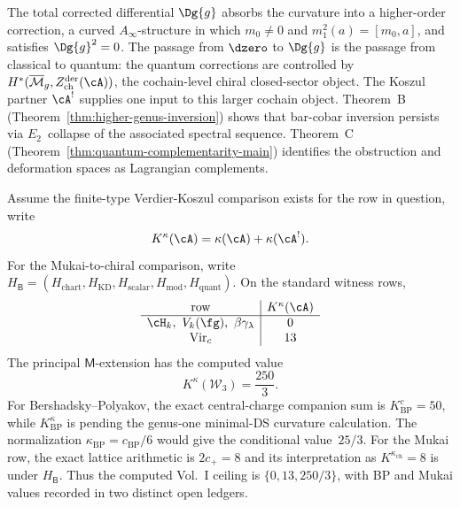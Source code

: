 The total corrected differential $\Dg{g}$ absorbs the curvature into a higher-order correction, a curved $A_\infty$-structure in which $m_0 \neq 0$ and $m_1^2(a) = [m_0, a]$, and satisfies $\Dg{g}^2 = 0$. The passage from $\dzero$ to $\Dg{g}$ is the passage from classical to quantum: the quantum corrections are controlled by
$H^*(\overline{\mathcal{M}}_g,
Z^{\mathrm{der}}_{\mathrm{ch}}(\cA))$, the cochain-level chiral
closed-sector object.  The Koszul partner $\cA^!$ supplies one input to
this larger cochain object.  Theorem~B
(Theorem~\ref{thm:higher-genus-inversion}) shows that bar-cobar
inversion persists via $E_2$~collapse of the associated spectral
sequence. Theorem~C (Theorem~\ref{thm:quantum-complementarity-main})
identifies the obstruction and deformation spaces as Lagrangian
complements.

\begin{proposition}
\label{prop:kps-scalar-verdier-sums}
Assume the finite-type Verdier-Koszul comparison exists for the row in
question, write
\[
 K^\kappa(\cA)=\kappa(\cA)+\kappa(\cA^!).
\]
For the Mukai-to-chiral comparison, write
$H_{\mathsf B}=(H_{\mathrm{chart}},H_{\mathrm{KD}},H_{\mathrm{scalar}},
H_{\mathrm{mod}},H_{\mathrm{quant}})$.
On the standard witness rows,
\[
\begin{array}{c|c}
\textup{row} & K^\kappa(\cA)\\
\hline
\cH_k,\ V_k(\fg),\ \beta\gamma_\lambda & 0\\
\mathrm{Vir}_c & 13
\end{array}
\]
The principal $\mathsf M$-extension has the computed value
\[
K^\kappa(\mathcal W_3)=\frac{250}{3}.
\]
For Bershadsky--Polyakov, the exact central-charge companion sum is
$K^c_{\mathrm{BP}}=50$, while $K^\kappa_{\mathrm{BP}}$ is
\ClaimStatusOpen{} pending the genus-one minimal-DS curvature
calculation.  The normalization $\kappa_{\mathrm{BP}}=c_{\mathrm{BP}}/6$
would give the conditional value~$25/3$.  For the Mukai row, the exact
lattice arithmetic is $2c_+=8$ and its interpretation as
$K^{\kappa_{\mathrm{ch}}}=8$ is \ClaimStatusConjectured{} under
$H_{\mathsf B}$.  Thus the computed Vol.~I ceiling is
$\{0,13,250/3\}$, with BP and Mukai values recorded in two distinct
open ledgers.
\end{proposition}

